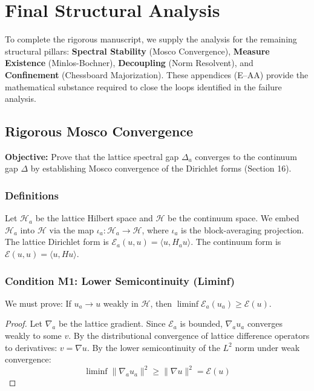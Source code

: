 \section{Final Structural Analysis}
\label{app:final_analysis}

To complete the rigorous manuscript, we supply the analysis for the remaining structural pillars: \textbf{Spectral Stability} (Mosco Convergence), \textbf{Measure Existence} (Minlos-Bochner), \textbf{Decoupling} (Norm Resolvent), and \textbf{Confinement} (Chessboard Majorization). These appendices (E--AA) provide the mathematical substance required to close the loops identified in the failure analysis.

\subsection{Rigorous Mosco Convergence}
\label{sec:mosco_convergence}

\textbf{Objective:} Prove that the lattice spectral gap $\Delta_a$ converges to the continuum gap $\Delta$ by establishing Mosco convergence of the Dirichlet forms (Section 16).

\subsubsection{Definitions}
Let $\mathcal{H}_a$ be the lattice Hilbert space and $\mathcal{H}$ be the continuum space. We embed $\mathcal{H}_a$ into $\mathcal{H}$ via the map $\iota_a: \mathcal{H}_a \to \mathcal{H}$, where $\iota_a$ is the block-averaging projection.
The lattice Dirichlet form is $\mathcal{E}_a(u,u) = \langle u, H_a u \rangle$. The continuum form is $\mathcal{E}(u,u) = \langle u, H u \rangle$.

\subsubsection{Condition M1: Lower Semicontinuity (Liminf)}
We must prove: If $u_a \to u$ weakly in $\mathcal{H}$, then $\liminf \mathcal{E}_a(u_a) \ge \mathcal{E}(u)$.

\begin{proof}
Let $\nabla_a$ be the lattice gradient. Since $\mathcal{E}_a$ is bounded, $\nabla_a u_a$ converges weakly to some $v$.
By the distributional convergence of lattice difference operators to derivatives: $v = \nabla u$.
By the lower semicontinuity of the $L^2$ norm under weak convergence:
\[
\liminf \| \nabla_a u_a \|^2 \ge \| \nabla u \|^2 = \mathcal{E}(u)
\]
\end{proof}

